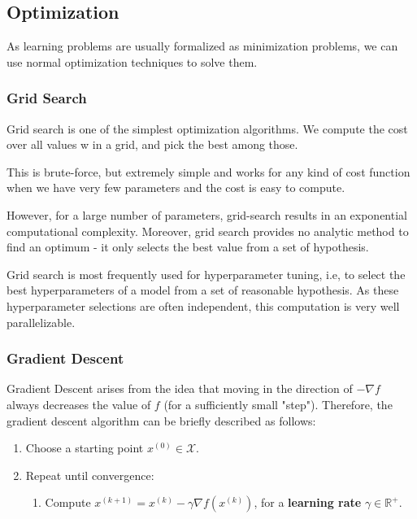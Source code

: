 \documentclass{article}
\newcommand{\R}{\mathbb{R}}
\begin{document}
\subsection{Optimization}

As learning problems are usually formalized as minimization problems, we can use normal optimization techniques to solve them.

\subsubsection{Grid Search}

Grid search is one of the simplest optimization algorithms. 
We compute the cost over all values w in a grid, and pick the best among those.

This is brute-force, but extremely simple and works for any kind of cost function when we have very few parameters and the cost is easy to compute.

However, for a large number of parameters, grid-search results in an exponential computational complexity.
Moreover, grid search provides no analytic method to find an optimum - it only selects the best value from a set of hypothesis.

Grid search is most frequently used for hyperparameter tuning, i.e, to select the best hyperparameters of a model from a set of reasonable hypothesis.
As these hyperparameter selections are often independent, this computation is very well parallelizable.

\subsubsection{Gradient Descent} 

Gradient Descent arises from the idea that moving in the direction of $-\nabla f$ always decreases the value of $f$ (for a sufficiently small "step").
Therefore, the gradient descent algorithm can be briefly described as follows:
\begin{enumerate}
    \item Choose a starting point $x^{(0)} \in \mathcal{X}$.
    \item Repeat until convergence:
    \begin{enumerate}
	\item Compute $x^{(k+1)} = x^{(k)} - \gamma \nabla f(x^{(k)})$, for a \textbf{learning rate} $\gamma \in \R^+$.
    \end{enumerate}
\end{enumerate}
\end{document}
